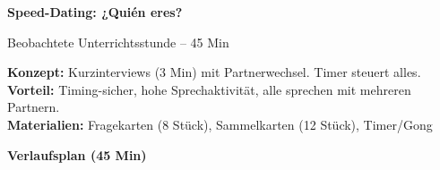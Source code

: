 \documentclass[11pt, a4paper]{article}
\begin{document}
\begin{center}
{\Large\bfseries\color{alternativeB} Speed-Dating: ¿Quién eres?}

\vspace{0.2cm}

{\small Beobachtete Unterrichtsstunde -- 45 Min}
\end{center}

\vspace{0.3cm}

\begin{tcolorbox}[colback=alternativeB!10, colframe=alternativeB, boxrule=1pt, arc=0pt]
\textbf{Konzept:} Kurzinterviews (3 Min) mit Partnerwechsel. Timer steuert alles.\\
\textbf{Vorteil:} Timing-sicher, hohe Sprechaktivität, alle sprechen mit mehreren Partnern.\\
\textbf{Materialien:} Fragekarten (8 Stück), Sammelkarten (12 Stück), Timer/Gong
\end{tcolorbox}

\vspace{0.3cm}

{\large\bfseries Verlaufsplan (45 Min)}

\vspace{0.2cm}
\end{document}
